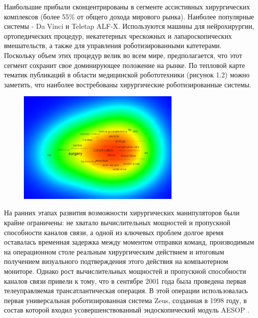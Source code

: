 Наибольшие прибыли сконцентрированы в сегменте ассистивных хирургических комплексов (более 55\% от общего дохода мирового рынка). Наиболее популярные системы - Da Vinci и Teletap ALF-X. Используются машины для нейрохирургии, ортопедических процедур, некатетерных чрескожных и лапароскопических вмешательств, а также для управления роботизированными катетерами. Поскольку объем этих процедур велик во всем мире, предполагается, что этот сегмент сохранит свое доминирующее положение на рынке. По тепловой карте тематик публикаций в области медицинской робототехники (рисунок 1.2) можно заметить, что наиболее востребованы хирургические роботизированные системы.

\begin{figure}[!h]
\begin{center}
\includegraphics[width=0.7\textwidth]{Рисунки/тепловая карта.png}
\caption{\centering {}}
\label{част}
\end{center}
\end{figure}

На ранних этапах развития возможности хирургических манипуляторов были крайне 
ограничены: не хватало вычислительных мощностей и пропускной способности каналов связи, а одной из ключевых проблем долгое время оставалась временная задержка между моментом отправки команд, производимым на операционном столе реальным хирургическим действием и итоговым получением визуального подтверждения этого действия на компьютерном мониторе. Однако рост вычислительных мощностей и пропускной способности каналов связи привели к тому, что в сентябре 2001 года была проведена первая телеуправляемая трансатлантическая операция. В этой операции использовалась первая универсальная роботизированная система Zeus, созданная в 1998 году, в состав которой входил усовершенствованный эндоскопический модуль AESOP \cite{litlink3}.


